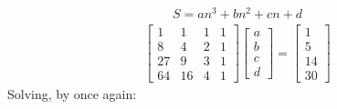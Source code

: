 \documentclass{article}
\begin{document}
\begin{gather*}
	S = an^{3} + bn^{2} + cn + d
\end{gather*}
\begin{gather*}
	\begin{bmatrix}
		1 & 1 & 1 & 1\\
		8 & 4 & 2 & 1\\
		27 & 9 & 3 & 1\\
		64 & 16 & 4 & 1
	\end{bmatrix}
	\begin{bmatrix}
		a\\
		b\\
		c\\
		d
	\end{bmatrix}
	=
	\begin{bmatrix}
		1\\
		5\\
		14\\
		30
	\end{bmatrix}
\end{gather*}
Solving, by once again:
\end{document}

